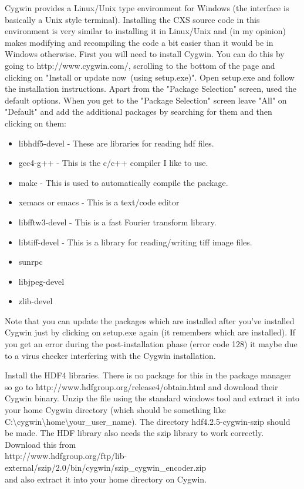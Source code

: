 \documentclass[]{cxs-software}
\begin{document}
Cygwin\cite{} provides a Linux/Unix type environment for Windows (the
interface is basically a Unix style terminal). Installing the CXS
source code in this environment is very similar to installing it in
Linux/Unix and (in my opinion) makes modifying and recompiling the
code a bit easier than it would be in Windows otherwise. First you
will need to install Cygwin. You can do this by going to
http://www.cygwin.com/, scrolling to the bottom of the page and
clicking on "Install or update now\ (using setup.exe)". Open setup.exe
and follow the installation instructions. Apart from the "Package
Selection" screen, used the default options. When you get to the
"Package Selection" screen leave "All" on "Default" and add the
additional packages by searching for them and then clicking on them:
\begin{itemize}
\item libhdf5-devel - These are libraries for reading hdf files.
\item gcc4-g++ - This is the c/c++ compiler I like to use.
\item make - This is used to automatically compile the package.
\item xemacs or emacs - This is a text/code editor
\item libfftw3-devel - This is a fast Fourier transform library.
\item libtiff-devel - This is a library for reading/writing tiff image files.
\item sunrpc
\item libjpeg-devel
\item zlib-devel
\end{itemize}

Note that you can update the packages which are installed after you've
installed Cygwin just by clicking on setup.exe again (it remembers
which are installed). If you get an error during the post-installation
phase (error code 128) it maybe due to a virus checker interfering
with the Cygwin installation.

Install the HDF4 libraries. There is no package for this in the
package manager so go to http://www.hdfgroup.org/release4/obtain.html
and download their Cygwin binary. Unzip the file using the standard
windows tool and extract it into your home Cygwin directory (which
should be something like
C:\textbackslash{}cygwin\textbackslash{}home\textbackslash{}your\_user\_name). The directory
hdf4.2.5-cygwin-szip should be made. The HDF library also needs the
szip library to work correctly. Download this from \\
http://www.hdfgroup.org/ftp/lib-external/szip/2.0/bin/cygwin/szip\_cygwin\_encoder.zip  \\
and also extract it into your home directory on Cygwin.
\end{document}
